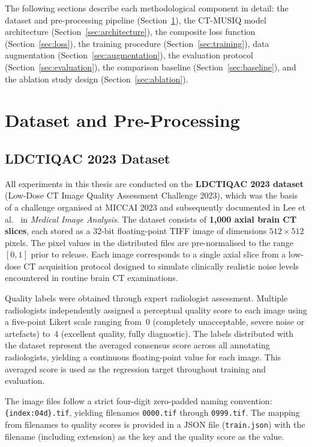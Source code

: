 The following sections describe each methodological component in detail: the dataset and
pre-processing pipeline (Section~\ref{sec:dataset}), the CT-MUSIQ model architecture
(Section~\ref{sec:architecture}), the composite loss function (Section~\ref{sec:loss}),
the training procedure (Section~\ref{sec:training}), data augmentation
(Section~\ref{sec:augmentation}), the evaluation protocol (Section~\ref{sec:evaluation}),
the comparison baseline (Section~\ref{sec:baseline}), and the ablation study design
(Section~\ref{sec:ablation}).


\section{Dataset and Pre-Processing}
\label{sec:dataset}

\subsection{LDCTIQAC 2023 Dataset}

All experiments in this thesis are conducted on the \textbf{LDCTIQAC 2023 dataset}
(Low-Dose CT Image Quality Assessment Challenge 2023), which was the basis of a challenge
organised at MICCAI 2023 and subsequently documented in Lee et al.\ \cite{lee2025ldctiqac}
in \textit{Medical Image Analysis}. The dataset consists of \textbf{1,000 axial brain CT
slices}, each stored as a 32-bit floating-point TIFF image of dimensions
$512 \times 512$ pixels. The pixel values in the distributed files are pre-normalised to
the range $[0, 1]$ prior to release. Each image corresponds to a single axial slice from
a low-dose CT acquisition protocol designed to simulate clinically realistic noise levels
encountered in routine brain CT examinations.

Quality labels were obtained through expert radiologist assessment. Multiple radiologists
independently assigned a perceptual quality score to each image using a five-point
Likert scale ranging from~0 (completely unacceptable, severe noise or artefacts) to~4
(excellent quality, fully diagnostic). The labels distributed with the dataset represent
the averaged consensus score across all annotating radiologists, yielding a continuous
floating-point value for each image. This averaged score is used as the regression target
throughout training and evaluation.

The image files follow a strict four-digit zero-padded naming convention:
\texttt{\{index:04d\}.tif}, yielding filenames \texttt{0000.tif} through
\texttt{0999.tif}. The mapping from filenames to quality scores is provided in a JSON
file (\texttt{train.json}) with the filename (including extension) as the key and the
quality score as the value.


